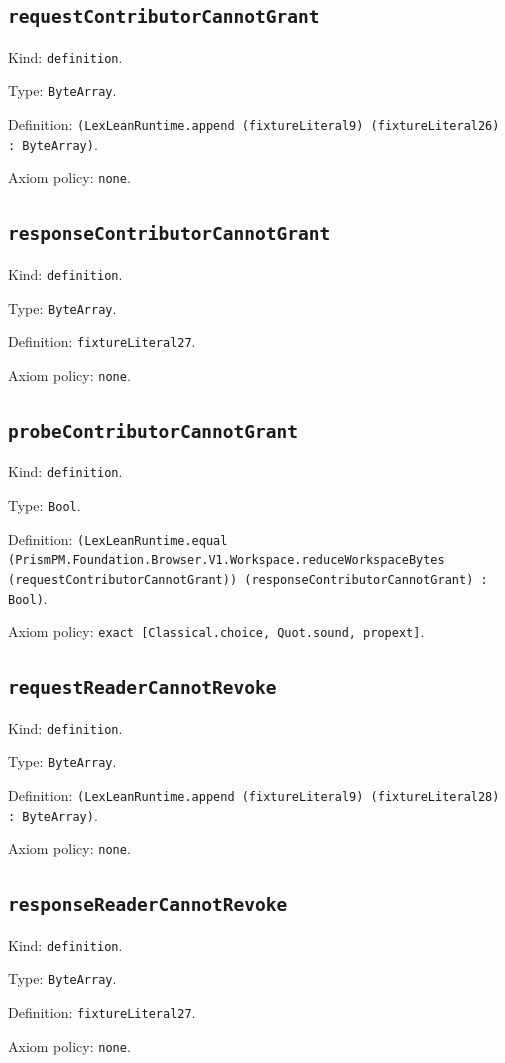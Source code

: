 \documentclass[11pt]{article}
\begin{document}
\subsection*{\texttt{requestContributorCannotGrant}}
\noindent Kind: \texttt{definition}.\par
\noindent Type: \texttt{ByteArray}.\par
\noindent Definition: \texttt{(LexLeanRuntime.append (fixtureLiteral9) (fixtureLiteral26) : ByteArray)}.\par
\noindent Axiom policy: \texttt{none}.\par
\subsection*{\texttt{responseContributorCannotGrant}}
\noindent Kind: \texttt{definition}.\par
\noindent Type: \texttt{ByteArray}.\par
\noindent Definition: \texttt{fixtureLiteral27}.\par
\noindent Axiom policy: \texttt{none}.\par
\subsection*{\texttt{probeContributorCannotGrant}}
\noindent Kind: \texttt{definition}.\par
\noindent Type: \texttt{Bool}.\par
\noindent Definition: \texttt{(LexLeanRuntime.equal (PrismPM.Foundation.Browser.V1.Workspace.reduceWorkspaceBytes (requestContributorCannotGrant)) (responseContributorCannotGrant) : Bool)}.\par
\noindent Axiom policy: \texttt{exact [Classical.choice, Quot.sound, propext]}.\par
\subsection*{\texttt{requestReaderCannotRevoke}}
\noindent Kind: \texttt{definition}.\par
\noindent Type: \texttt{ByteArray}.\par
\noindent Definition: \texttt{(LexLeanRuntime.append (fixtureLiteral9) (fixtureLiteral28) : ByteArray)}.\par
\noindent Axiom policy: \texttt{none}.\par
\subsection*{\texttt{responseReaderCannotRevoke}}
\noindent Kind: \texttt{definition}.\par
\noindent Type: \texttt{ByteArray}.\par
\noindent Definition: \texttt{fixtureLiteral27}.\par
\noindent Axiom policy: \texttt{none}.\par
\end{document}
